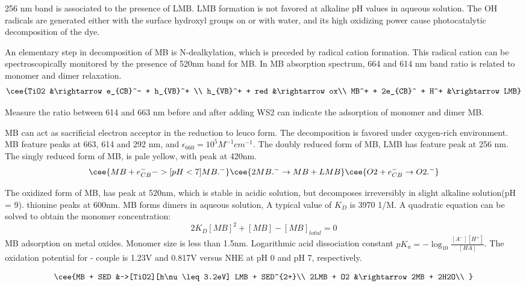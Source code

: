 256 nm band is associated to the presence of LMB. LMB formation is not favored at alkaline pH values in aqueous solution. The OH radicals are generated either with the surface hydroxyl groups on  or with water, and its high oxidizing power cause photocatalytic decomposition of the dye.

An elementary step in decomposition of MB is N-dealkylation, which is preceded by radical cation formation.\cite{Takizawa1978} This radical cation can be spectroscopically monitored by the presence of 520nm band for MB. In MB absorption spectrum, 664 and 614 nm band ratio is related to monomer and dimer relaxation.
\begin{align}
\cee{TiO2 &\rightarrow e_{CB}^- + h_{VB}^+ \\
h_{VB}^+ + red &\rightarrow ox\\
MB^+ + 2e_{CB}^ + H^+ &\rightarrow LMB}
\end{align}

Measure the ratio between 614 and 663 nm before and after adding WS2 can indicate the adsorption of monomer and dimer MB.

\cite{Mills1999} MB can act as sacrificial electron acceptor in the reduction to leuco form. The decomposition is favored under oxygen-rich environment. MB feature peaks at 663, 614 and 292 nm, and $\epsilon_{660}=10^5 M^{-1}cm^{-1}$. The doubly reduced form of MB, LMB has feature peak at 256 nm. The singly reduced form of MB,  is pale yellow, with peak at 420nm.
\[
\cee{MB + e_{CB}^- ->[pH<7] MB.^-}
\cee{2MB.^- \rightarrow MB + LMB}
\cee{O2 + e_{CB}^- \rightarrow O2.^-}
\]

The oxidized form of MB,  has peak at 520nm, which is stable in acidic solution, but decomposes irreversibly in slight alkaline solution(pH = 9).
thionine peaks at 600nm.
MB forms dimers in aqueous solution,
A typical value of $K_D$ is 3970 1/M. A quadratic equation can be solved to obtain the monomer concentration:
\[
2K_D [MB]^2 + [MB] - [MB]_{total} = 0
\]
MB adsorption on metal oxides. Monomer size is less than 1.5nm.
Logarithmic acid dissociation constant $pK_a= -\log_10 \frac{[A^-][H^+]}{[HA]}$. The oxidation potential for - couple is 1.23V and 0.817V versus NHE at pH 0 and pH 7, respectively.

\[
\cee{MB + SED &->[TiO2][h\nu \leq 3.2eV] LMB + SED^{2+}\\
2LMB + O2 &\rightarrow 2MB + 2H2O\\

}
\]



